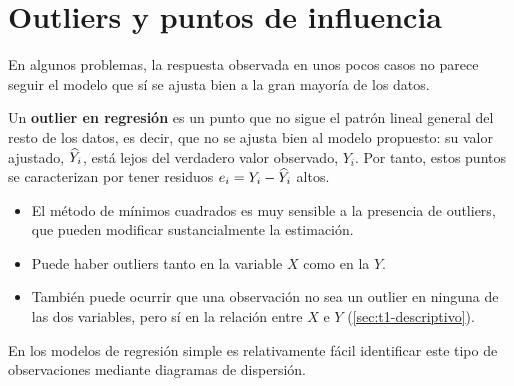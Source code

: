 \section{Outliers y puntos de influencia}
\label{sec:t4-outliers}

En algunos problemas, la respuesta observada en unos pocos casos no parece seguir el modelo que
sí se ajusta bien a la gran mayoría de los datos.

\begin{definicion}
  Un \textbf{outlier en regresión} es un punto que no sigue el patrón lineal general del resto
  de los datos, es decir, que no se ajusta bien al modelo propuesto: su valor ajustado,
  $\widehat{Y}_i$, está lejos del verdadero valor observado, $Y_i$. Por tanto, estos puntos se
  caracterizan por tener residuos $e_i=Y_i-\widehat{Y}_i$ altos.
\end{definicion}

\begin{itemize}
  \item El método de mínimos cuadrados es muy sensible a la presencia de outliers, que pueden
    modificar sustancialmente la estimación.
  \item Puede haber outliers tanto en la variable $X$ como en la $Y$.
  \item También puede ocurrir que una observación no sea un outlier en ninguna de las dos
    variables, pero sí en la relación entre $X$ e $Y$ (\cref{sec:t1-descriptivo}).
\end{itemize}
En los modelos de regresión simple es relativamente fácil identificar este tipo de
observaciones mediante diagramas de dispersión.

